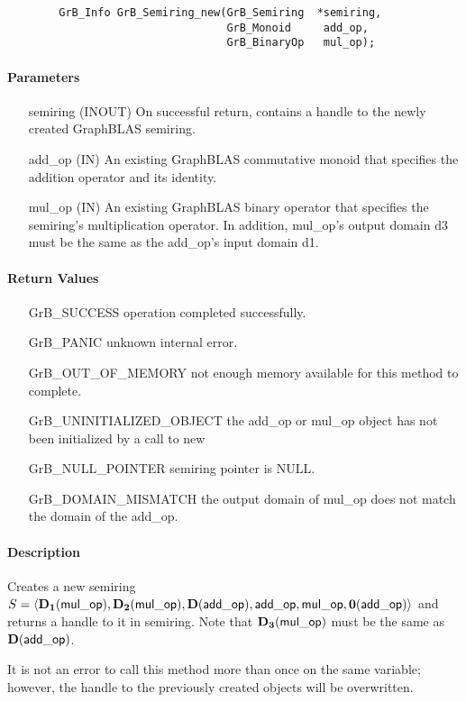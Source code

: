 \begin{verbatim}
        GrB_Info GrB_Semiring_new(GrB_Semiring  *semiring,
                                  GrB_Monoid     add_op,
                                  GrB_BinaryOp   mul_op);
\end{verbatim}

\paragraph{Parameters}

\begin{itemize}[leftmargin=1.1in]
    \item[{\sf semiring}] ({\sf INOUT}) On successful return, contains a 
    handle to the newly created GraphBLAS semiring.
    \item[{\sf add\_op}]  ({\sf IN}) An existing GraphBLAS commutative monoid that specifies 
    the addition operator and its identity.
    \item[{\sf mul\_op}]  ({\sf IN}) An existing GraphBLAS binary operator that 
    specifies the semiring's multiplication operator. In addition, {\sf mul\_op}'s output domain {\sf d3} must be the same as the {\sf add\_op}'s input domain {\sf d1}.
\end{itemize}


\paragraph{Return Values}

\begin{itemize}[leftmargin=2.1in]
\item[{\sf GrB\_SUCCESS}]           operation completed successfully.
\item[{\sf GrB\_PANIC}]             unknown internal error.
\item[{\sf GrB\_OUT\_OF\_MEMORY}]          not enough memory available for this method to complete.
\item[{\sf GrB\_UNINITIALIZED\_OBJECT}]          the {\sf add\_op} or {\sf mul\_op} object has
                                    not been initialized by a call to {\sf new}
\item[{\sf GrB\_NULL\_POINTER}]    {\sf semiring} pointer is {\sf NULL}.
\item[{\sf GrB\_DOMAIN\_MISMATCH}]  the output domain of {\sf mul\_op} does not
                                    match the domain of the {\sf add\_op}.
\end{itemize}

\paragraph{Description}

Creates a new semiring $S = \langle \bold{D_1}({\sf mul\_op}), 
\bold{D_2}({\sf mul\_op}), \bold{D}({\sf add\_op}), {\sf add\_op}, 
{\sf mul\_op}, \bold{0}({\sf add\_op})\rangle$ and returns a handle to it in 
{\sf semiring}.  Note that $\bold{D_3}({\sf mul\_op})$ must be the same as 
$\bold{D}({\sf add\_op})$.

It is not an error to call this method more than once on the same variable;  
however, the handle to the previously created objects will be overwritten. 
